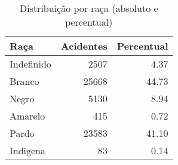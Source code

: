 \begin{table}
\caption{Distribuição por raça (absoluto e percentual)}
\begin{tabular}{lrr}
\toprule
Raça & Acidentes & Percentual \\
\midrule
Indefinido & 2507 & 4.37 \\
Branco & 25668 & 44.73 \\
Negro & 5130 & 8.94 \\
Amarelo & 415 & 0.72 \\
Pardo & 23583 & 41.10 \\
Indigena & 83 & 0.14 \\
\bottomrule
\end{tabular}
\end{table}
